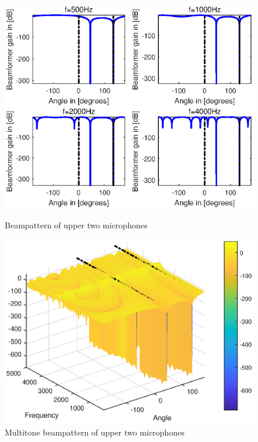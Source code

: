 \documentclass[onecolumn, conference]{IEEEtran}
\begin{document}
\begin{figure}[htbp]
\begin{minipage}[b]{0.5\linewidth}
	\centerline{\includegraphics[width=1\textwidth]{img/1_a_2.eps}}
	\caption{Beampattern of upper two microphones}
	\label{Beampattern of upper two microphones135}
\end{minipage}
	\hfill
\begin{minipage}[b]{0.5\linewidth}
	\centerline{\includegraphics[width=1\textwidth]{img/1_a_2_multi_135.eps}}
	\caption{Multitone beampattern of upper two microphones}
	\label{Multitone beampattern of upper two microphones135}
\end{minipage}
\end{figure}
\end{document}
